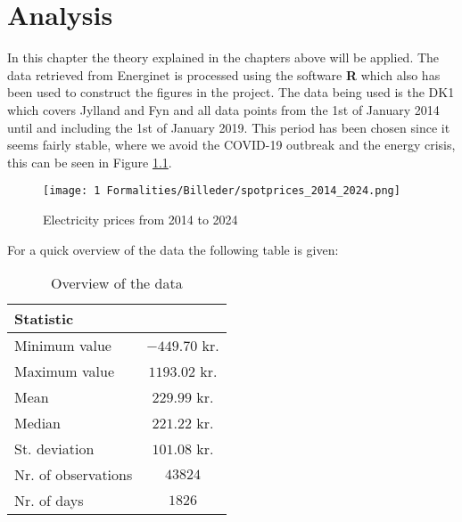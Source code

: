 \chapter{Analysis}
In this chapter the theory explained in the chapters above will be applied. The data retrieved from Energinet is processed using the software \textbf{R} which also has been used to construct the figures in the project. The data being used is the DK1 which covers Jylland and Fyn and all data points from the 1st of January 2014 until and including the 1st of January 2019. This period has been chosen since it seems fairly stable, where we avoid the COVID-19 outbreak and the energy crisis, this can be seen in Figure \ref{fig:Spot_prices_2014_2024}. 
\begin{figure}[H] 
    \centering
    \texttt{[image: 1 Formalities/Billeder/spotprices\_2014\_2024.png]}
    \caption{Electricity prices from 2014 to 2024}
    \label{fig:Spot_prices_2014_2024}
\end{figure}
For a quick overview of the data the following table is given:
\begin{table}[H]
\centering
\begin{tabular}{|l|c|}
\hline
\textbf{Statistic} & {} \\
\hline
Minimum value & $-449.70$ kr. \\
Maximum value & $1193.02$ kr. \\
Mean & $229.99$ kr. \\
Median & $221.22$ kr. \\
St. deviation & $101.08$ kr. \\
Nr. of observations & $43824$ \\
Nr. of days & $1826$\\
\hline
\end{tabular}
\caption{Overview of the data}
\label{tab:summary_statistics}
\end{table}

